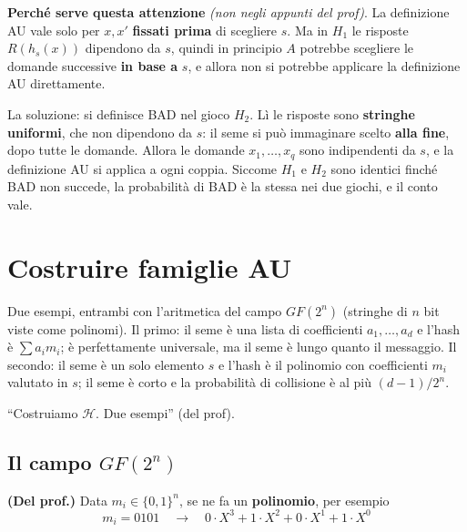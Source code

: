 \begin{nota}
\textbf{Perché serve questa attenzione} \emph{(non negli appunti del prof)}. La definizione AU vale solo per \(x, x'\) \textbf{fissati prima} di scegliere \(s\). Ma in \(H_1\) le risposte \(R(h_s(x))\) dipendono da \(s\), quindi in principio \(A\) potrebbe scegliere le domande successive \textbf{in base a} \(s\), e allora non si potrebbe applicare la definizione AU direttamente.

La soluzione: si definisce BAD nel gioco \(H_2\). Lì le risposte sono \textbf{stringhe uniformi}, che non dipendono da \(s\): il seme si può immaginare scelto \textbf{alla fine}, dopo tutte le domande. Allora le domande \(x_1, \dots, x_q\) sono indipendenti da \(s\), e la definizione AU si applica a ogni coppia. Siccome \(H_1\) e \(H_2\) sono identici finché BAD non succede, la probabilità di BAD è la stessa nei due giochi, e il conto vale.
\end{nota}

\section{Costruire famiglie AU}

\begin{inbreve}
Due esempi, entrambi con l'aritmetica del campo \(GF(2^n)\) (stringhe di \(n\) bit viste come polinomi). Il primo: il seme è una lista di coefficienti \(a_1, \dots, a_d\) e l'hash è \(\sum a_i m_i\); è perfettamente universale, ma il seme è lungo quanto il messaggio. Il secondo: il seme è un solo elemento \(s\) e l'hash è il polinomio con coefficienti \(m_i\) valutato in \(s\); il seme è corto e la probabilità di collisione è al più \((d-1)/2^n\).
\end{inbreve}

``Costruiamo \(\mathcal{H}\). Due esempi'' (del prof).

\subsection{Il campo \texorpdfstring{\(GF(2^n)\)}{GF(2\^{}n)}}

\textbf{(Del prof.)} Data \(m_i \in \{0,1\}^n\), se ne fa un \textbf{polinomio}, per esempio
\[
m_i = 0101 \quad \to \quad 0 \cdot X^3 + 1 \cdot X^2 + 0 \cdot X^1 + 1 \cdot X^0
\]

